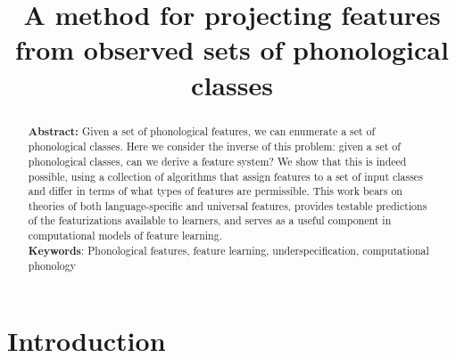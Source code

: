\documentclass[12pt, oneside]{article}   	%
\title{A method for projecting features from observed sets of phonological classes}
\author{
}
\date{\vspace{-10ex}}							%
\begin{document}
\RaggedRight
\maketitle

\begin{abstract}
\noindent \textbf{Abstract:} Given a set of phonological features, we can enumerate a set of phonological classes. Here we consider the inverse of this problem: given a set of phonological classes, can we derive a feature system? We show that this is indeed possible, using a collection of algorithms that assign features to a set of input classes and differ in terms of what types of features are permissible. This work bears on theories of both language-specific and universal features, provides testable predictions of the featurizations available to learners, and serves as a useful component in computational models of feature learning.\\
\noindent \textbf{Keywords}: Phonological features, feature learning, underspecification, computational phonology
\end{abstract}


\section{Introduction}
\end{document}

